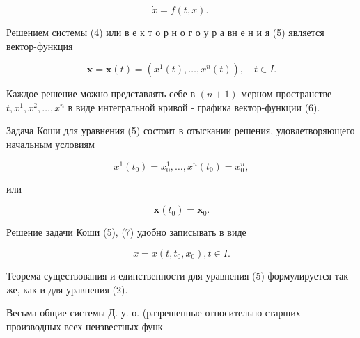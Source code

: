 \documentclass[10pt]{article}
\begin{document}
\[

\dot{x}=f(t, x) \text {. }

\]



Решением системы (4) или в е к т о р н о г о у р а вн е н и я (5) является вектор-функция



\[

\boldsymbol{x}=\boldsymbol{x}(t)=\left(x^{1}(t), \ldots, x^{n}(t)\right), \quad t \in I .

\]



Каждое решение можно представлять себе в $(n+1)$-мерном пространстве $t, x^{1}, x^{2}, \ldots, x^{n}$ в виде интегральной кривой - графика вектор-функции (6).



Задача Коши для уравнения (5) состоит в отыскании решения, удовлетворяющего начальным условиям



\[

x^{1}\left(t_{0}\right)=x_{0}^{1}, \ldots, x^{n}\left(t_{0}\right)=x_{0}^{n},

\]



или



\[

\boldsymbol{x}\left(t_{0}\right)=\boldsymbol{x}_{0} .

\]



Решение задачи Коши (5), (7) удобно записывать в виде



\[

x=x\left(t, t_{0}, x_{0}\right), t \in I .

\]



Теорема существования и единственности для уравнения (5) формулируется так же, как и для уравнения (2).



Весьма общие системы Д. у. о. (разрешенные относительно старших производных всех неизвестных функ-
\end{document}
